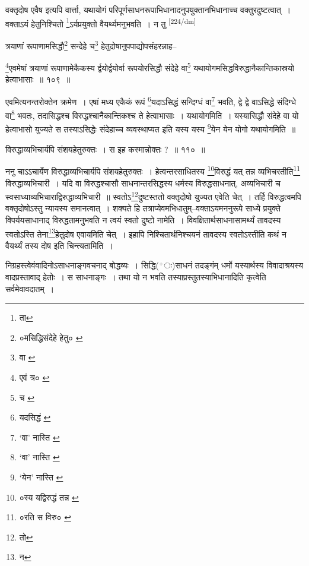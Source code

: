 \documentclass[article,12pt,a4paper]{memoir}
\newcommand{\add}[1]{($^{+}$#1)}
\begin{document}
	  \pstart वक्तृदोष एवैष इत्यपि वार्त्ता, यथायोगं परिपूर्णसाधनरूपाभिधानादनुपयुक्तानभिधानाच्च वक्तुरदुष्टत्वात् । वक्ताऽयं हेतुनिश्चितो \footnote{ता}ऽर्यप्रयुक्तो वैयर्थ्यमनुभवति । न तु \leavevmode\textsuperscript{\rmlatinfont\tiny [224/dm]} 
	  
	त्रयाणां रूपाणामसिद्धौ\footnote{०मसिद्धिसंदेहे हेतु० \cite{dp-msC}} सन्देहे च\footnote{वा \cite{dp-msD}} हेतुदोषानुपपाद्योपसंहरन्नाह-- 
	  
	\footnote{एवं त्र० \cite{dp-msB} \cite{dp-msD} \cite{dp-edP} \cite{dp-edH} \cite{dp-edE} \cite{dp-edN}}एवमेषां त्रयाणां रूपाणामेकैकस्य र्द्वयोर्द्वयोर्वा रूपयोरसिद्धौ संदेहे वा\footnote{च \cite{dp-msB} \cite{dp-edP} \cite{dp-edH} \cite{dp-edE} \cite{dp-edN}} यथायोगमसिद्धविरुद्धानैकान्तिकास्रयो हेत्वाभासाः ॥ १०९ ॥ 
	  
	एवमित्यनन्तरोक्तेन क्रमेण । एषां मध्य एकैकं रूपं \footnote{यदसिद्धं \cite{dp-msA} \cite{dp-msB} \cite{dp-edP} \cite{dp-edH} \cite{dp-edN}}यदाऽसिद्धं सन्दिग्धं वा\footnote{‘वा’ नास्ति \cite{dp-msB}} भवति, द्वे द्वे वाऽसिद्धे संदिग्धे वा\footnote{‘वा’ नास्ति \cite{dp-msB}} भवतः, तदासिद्धश्च विरुद्धश्चानैकान्तिकश्च ते हेत्वाभासाः । यथायोगमिति । यस्यासिद्धौ संदेहे वा यो हेत्वाभासो युज्यते स तस्याऽसिद्धेः संदेहाच्च व्यवस्थाप्यत इति यस्य यस्य \footnote{‘येन’ नास्ति \cite{dp-msB}}येन येन योगो यथायोगमिति ॥ 
	  
	विरुद्धाव्यभिचार्यपि संशयहेतुरुक्तः । स इह कस्मान्नोक्तः ? ॥ ११० ॥ 
	  
	ननु चाऽऽचार्येण विरुद्धाव्यभिचार्यपि संशयहेतुरुक्तः । हेत्वन्तरसाधितस्य \footnote{०स्य यद्विरुद्धं तन्न \cite{dp-msB} \cite{dp-msD}}विरुद्धं यत् तन्न व्यभिचरतीति\footnote{०रति स विरु० \cite{dp-msA} \cite{dp-msB} \cite{dp-edP} \cite{dp-edH} \cite{dp-edE} \cite{dp-edN}} विरुद्धाव्यभिचारी । यदि वा विरुद्धश्चासौ साधनान्तरसिद्धस्य धर्मस्य विरुद्धसाधनात्, अव्यभिचारी च स्वसाध्याव्यभिचाराद्विरुद्धाव्यभिचारी ॥ स्वतोऽ\footnote{तो}दुष्टस्ततो वक्तृदोषो युज्यत एवेति चेत् । तर्हि विरुद्धत्वमपि वक्तृदोषोऽस्तु न्यायस्य समानत्वात् । शक्यते हि तत्राप्येवमभिधातुम्--वक्ताऽयमननुरूपे साध्ये प्रयुक्ते विपर्ययसाधानाद् विरुद्धतामनुभवति न त्वयं स्वतो दुष्टो नामेति । विवक्षितार्थसाधनासामर्थ्यं तावदस्य स्वतोऽस्ति तेना\footnote{न}हेतुदोष एवायमिति चेत् । इहापि निश्चितार्थनिश्चयनं तावदस्य स्वतोऽस्तीति कथं न वैयर्थ्यं तस्य दोष इति चिन्त्यतामिति ।
	\pend
      

	  \pstart निग्रहस्त्वेवंवादिनोऽसाधनाङ्गवचनाद् बोद्धव्यः । सिद्धि\add{ः}साधनं तदङ्गंम् धर्मो यस्यार्थस्य विवादाश्रयस्य वादप्रस्तावाद् हेतोः । स साधनाङ्गः । तथा यो न भवति तस्याप्रस्तुतस्याभिधानादिति कृत्वेति सर्वमेवावदातम् ।
	\pend
      
\end{document}
